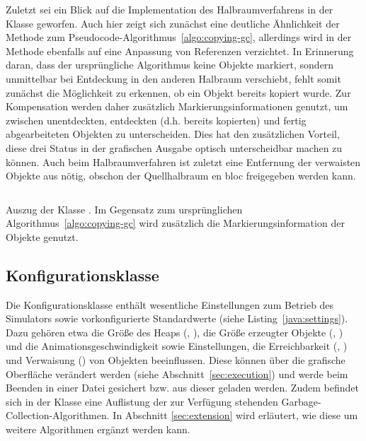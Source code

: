 Zuletzt sei ein Blick auf die Implementation des Halbraumverfahrens in der Klasse  geworfen.
Auch hier zeigt sich zunächst eine deutliche Ähnlichkeit der Methode  zum Pseudocode-Algorithmus~\ref{algo:copying-gc}, allerdings wird in der Methode  ebenfalls auf eine Anpassung von Referenzen verzichtet.
In Erinnerung daran, dass der ursprüngliche Algorithmus keine Objekte markiert, sondern unmittelbar bei Entdeckung in den anderen Halbraum verschiebt, fehlt somit zunächst die Möglichkeit zu erkennen, ob ein Objekt bereits kopiert wurde.
Zur Kompensation werden daher zusätzlich Markierungsinformationen genutzt, um zwischen unentdeckten, entdeckten (d.h. bereits kopierten) und fertig abgearbeiteten Objekten zu unterscheiden.
Dies hat den zusätzlichen Vorteil, diese drei Status in der grafischen Ausgabe optisch unterscheidbar machen zu können.
Auch beim Halbraumverfahren ist zuletzt eine Entfernung der verwaisten Objekte aus  nötig, obschon der Quellhalbraum en bloc freigegeben werden kann.

\begin{listing}[h]
	\inputminted[]{java}{code/Semispace-core.java}
	\caption[Auszug der Klasse ]{Auszug der Klasse . Im Gegensatz zum ursprünglichen Algorithmus~\ref{algo:copying-gc} wird zusätzlich die Markierungsinformation der Objekte genutzt.}
	\label{java:semispace-core}
\end{listing}

\subsection{Konfigurationsklasse }
\label{sub:settings}
Die Konfigurationsklasse  enthält wesentliche Einstellungen zum Betrieb des Simulators sowie vorkonfigurierte Standardwerte (siehe Listing~\ref{java:settings}).
Dazu gehören etwa die Größe des Heaps (, ), die Größe erzeugter Objekte (, ) und die Animationsgeschwindigkeit sowie Einstellungen, die Erreichbarkeit (, ) und Verwaisung () von Objekten beeinflussen.
Diese können über die grafische Oberfläche verändert werden (siehe Abschnitt~\ref{sec:execution}) und werde beim Beenden in einer Datei  gesichert bzw. aus dieser geladen werden.
Zudem befindet sich in der Klasse  eine Auflistung der zur Verfügung stehenden Garbage-Collection-Algorithmen.
In Abschnitt \ref{sec:extension} wird erläutert, wie diese um weitere Algorithmen ergänzt werden kann.

